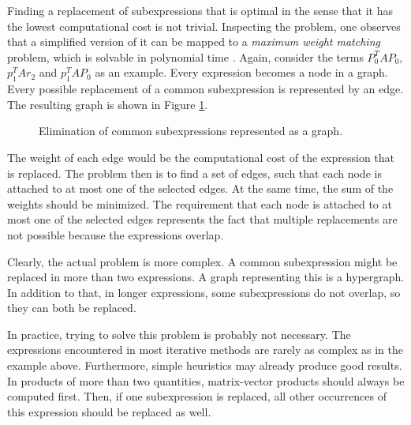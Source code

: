 Finding a replacement of subexpressions that is optimal in the sense that it has the lowest computational cost is not trivial. Inspecting the problem, one observes that a simplified version of it can be mapped to a \emph{maximum weight matching} problem, which is solvable in polynomial time \cite{edmonds1965maximum}. Again, consider the terms $P_0^T A P_0$, $p_1^T A r_2$ and $p_1^T A P_0$ as an example. Every expression becomes a node in a graph. Every possible replacement of a common subexpression is represented by an edge. The resulting graph is shown in Figure \ref{fig:CSE}.
%
\begin{figure}[h]
\centering
{}
\caption{Elimination of common subexpressions represented as a graph.}
\label{fig:CSE}
\end{figure}
%
The weight of each edge would be the computational cost of the expression that is replaced. The problem then is to find a set of edges, such that each node is attached to at most one of the selected edges. At the same time, the sum of the weights should be minimized. The requirement that each node is attached to at most one of the selected edges represents the fact that multiple replacements are not possible because the expressions overlap.

Clearly, the actual problem is more complex. A common subexpression might be replaced in more than two expressions. A graph representing this is a hypergraph. In addition to that, in longer expressions, some subexpressions do not overlap, so they can both be replaced. 

In practice, trying to solve this problem is probably not necessary. The expressions encountered in most iterative methods are rarely as complex as in the example above. Furthermore, simple heuristics may already produce good results. In products of more than two quantities, matrix-vector products should always be computed first. Then, if one subexpression is replaced, all other occurrences of this expression should be replaced as well.

